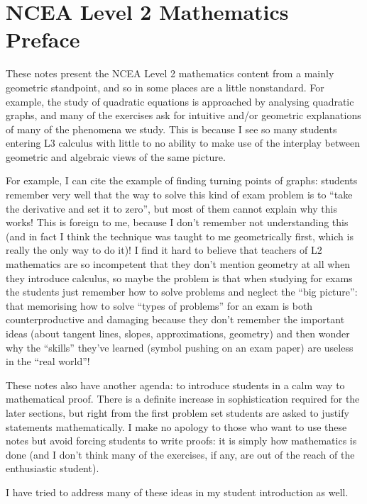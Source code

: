 


\section*{NCEA Level 2 Mathematics\\Preface}
These notes present the NCEA Level 2 mathematics content from a mainly geometric standpoint, and so in some places
are a little nonstandard. For example, the study of quadratic equations is approached by analysing quadratic graphs,
and many of the exercises ask for intuitive and/or geometric explanations of many of the phenomena we study. This is
because I see so many students entering L3 calculus with little to no ability to make use of the interplay between geometric and
algebraic views of the same picture.

For example, I can cite the example of finding turning points of graphs: students remember very well that the way to solve this kind
of exam problem is to ``take the derivative and set it to zero'', but most of them cannot explain why this works! This is foreign to
me, because I don't remember not understanding this (and in fact I think the technique was taught to me geometrically first, which is
really the only way to do it)! I find it hard to believe that teachers of L2 mathematics are so incompetent that they don't mention
geometry at all when they introduce calculus, so maybe the problem is that when studying for exams the students just remember how to
solve problems and neglect the ``big picture'': that memorising how to solve ``types of problems'' for an exam is both counterproductive
and damaging because they don't remember the important ideas (about tangent lines, slopes, approximations, geometry) and then wonder why
the ``skills'' they've learned (symbol pushing on an exam paper) are useless in the ``real world''!

These notes also have another agenda: to introduce students in a calm way to mathematical proof. There is a definite increase in sophistication
required for the later sections, but right from the first problem set students are asked to justify statements mathematically. I make no apology
to those who want to use these notes but avoid forcing students to write proofs: it is simply how mathematics is done (and I don't think many
of the exercises, if any, are out of the reach of the enthusiastic student).

I have tried to address many of these ideas in my student introduction as well.

